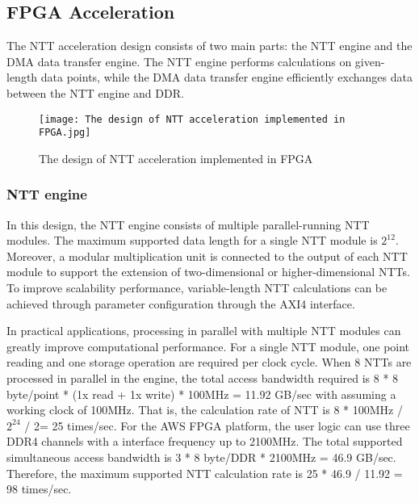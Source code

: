 \subsection{FPGA Acceleration}\label{section: fpga-acceleration}

The NTT acceleration design consists of two main parts: the NTT engine and the DMA data transfer engine. The NTT engine performs calculations on given-length data points, while the DMA data transfer engine efficiently exchanges data between the NTT engine and DDR.

\begin{figure}[ht]
  \centering
  \texttt{[image: The design of NTT acceleration implemented in FPGA.jpg]}
  \caption{The design of NTT acceleration implemented in FPGA}
  \label{fig:The design of NTT acceleration implemented in FPGA}
\end{figure}

\subsubsection{NTT engine}

In this design, the NTT engine consists of multiple parallel-running NTT modules. The maximum supported data length for a single NTT module is $2^{12}$. Moreover, a  modular multiplication unit is connected to the output of each NTT module to support the extension of two-dimensional or higher-dimensional NTTs. To improve scalability performance, variable-length NTT calculations can be achieved through parameter configuration through the AXI4 interface.

In practical applications, processing in parallel with multiple NTT modules can greatly improve computational performance. For a single NTT module, one point reading and one storage operation are required per clock cycle. When 8 NTTs are processed in parallel in the engine, the total access bandwidth required is 8 * 8 byte/point * (1x read + 1x write) * 100MHz = 11.92 GB/sec with assuming a working clock of 100MHz. That is, the calculation rate of NTT is 8 * 100MHz / $2^{24}$ / 2= 25 times/sec. For the AWS FPGA platform, the user logic can use three DDR4 channels with a interface frequency up to 2100MHz. The total supported simultaneous access bandwidth is 3 * 8 byte/DDR * 2100MHz = 46.9 GB/sec. Therefore, the maximum supported NTT calculation rate is 25 * 46.9 / 11.92 = 98 times/sec.



